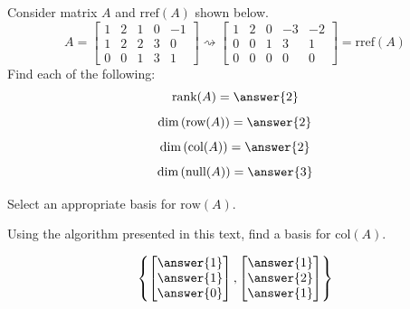 \documentclass{ximera}
\begin{document}
\begin{exercise}
Consider matrix $A$ and $\text{rref}(A)$ shown below.
$$A=\begin{bmatrix}1&2&1&0&-1\\1&2&2&3&0\\0&0&1&3&1\end{bmatrix}\rightsquigarrow\begin{bmatrix}1&2&0&-3&-2\\0&0&1&3&1\\0&0&0&0&0\end{bmatrix}=\mbox{rref}(A)$$
Find each of the following:
$$\text{rank}(A)=\answer{2}$$
$$\text{dim}\left(\text{row}(A)\right)=\answer{2}$$
$$\text{dim}\left(\text{col}(A)\right)=\answer{2}$$
$$\text{dim}\left(\text{null}(A)\right)=\answer{3}$$
 
Select an appropriate basis for $\text{row}(A)$.
\begin{multipleChoice}
 \end{multipleChoice}
 
 Using the algorithm presented in this text, find a basis for $\text{col}(A)$.
 
 $$\left\{\begin{bmatrix}\answer{1}\\\answer{1}\\\answer{0}\end{bmatrix}, \begin{bmatrix}\answer{1}\\\answer{2}\\\answer{1}\end{bmatrix}\right\}$$
 
\end{exercise}
\end{document}
